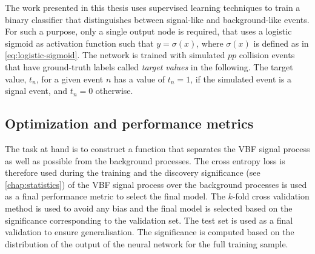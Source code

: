 The work presented in this thesis uses supervised learning techniques to train a binary classifier that distinguishes between signal-like and background-like events. 
For such a purpose, only a single output node is required, that uses a logistic sigmoid as activation function such that $y = \sigma(x)$, where $\sigma(x)$ is defined as in \cref{eq:logistic-sigmoid}.
The network is trained with simulated $pp$ collision events that have ground-truth labels called \emph{target values} in the following. The target value, $t_n$, for a given event $n$ has a value of $t_n = 1$, if the simulated event is a signal event, and $t_n = 0$ otherwise.


\subsection{Optimization and performance metrics}
The task at hand is to construct a function that separates the VBF signal process as well as possible from the background processes.
The cross entropy loss is therefore used during the training and the discovery significance (see \cref{chap:statistics}) of the VBF signal process over the background processes is used as a final performance metric to select the final model.
The $k$-fold cross validation method is used to avoid any bias and the final model is selected based on the significance corresponding to the validation set. 
The test set is used as a final validation to ensure generalisation. 
The significance is computed based on the distribution of the output of the neural network for the full training sample. 


